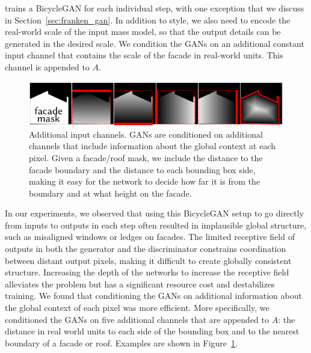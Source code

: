 \systemName trains a BicycleGAN for each individual step, with one exception that we discuss in Section~\ref{sec:franken_gan}. In addition to style, we also need to encode the real-world scale of the input mass model, so that the output details can be generated in the desired scale.
%
%
We condition the GANs on an additional constant input channel that contains the scale of the facade in real-world units. This channel is appended to $A$.

\begin{figure}[t]
    \centering
    \includegraphics[width=\columnwidth]{images/metrics.pdf}
    \caption{Additional input channels. GANs are conditioned on additional channels that include information about the global context at each pixel. Given a facade/roof mask, we include the distance to the facade boundary and the distance to each bounding box side, making it easy for the network to decide how far it is from the boundary and at what height on the facade.}
    \vspace{-5pt}
    \label{fig:context_info}
\end{figure}

In our experiments, we observed that using this BicycleGAN setup to go directly from inputs to outputs in each step often resulted in implausible global structure, such as misaligned windows or ledges on facades. The limited receptive field of outputs in both the generator and the discriminator constrains coordination between distant output pixels, making it difficult to create globally consistent structure. Increasing the depth of the networks to increase the receptive field alleviates the problem but has a significant resource cost and destabilizes training. We found that conditioning the GANs on additional information about the global context of each pixel was more efficient. More specifically, we conditioned the GANs on five additional channels that are appended to $A$: the distance in real world units to each side of the bounding box and to the nearest boundary of a facade or roof. Examples are shown in Figure~\ref{fig:context_info}.


